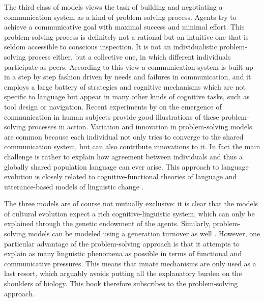 The third class of models views the task of building and negotiating a communication system as a kind of problem-solving process. Agents try to achieve a communicative goal with maximal success and minimal effort. This problem-solving process is definitely not a rational but an intuitive one that is seldom accessible to conscious inspection. It is not an individualistic problem-solving process either, but a collective one, in which different individuals participate as peers. According to this view a communication system is built up in a step by step fashion driven by needs and failures in communication, and it employs a large battery of strategies and cognitive mechanisms which are not specific to language but appear in many other kinds of cognitive tasks, such as tool design or navigation. Recent experiments by \citet{galantucci05experimental} on the emergence of communication in human subjects provide good illustrations of these problem-solving processes in action. Variation and innovation in problem-solving models are common because each individual not only tries to converge to the shared communication system, but can also contribute innovations to it. In fact the main challenge is rather to explain how agreement between individuals and thus a globally shared population language can ever arise. This approach to language evolution is closely related to cognitive-functional theories of language and utterance-based models of linguistic change \citep{croft00explaining, croft05relevance}.

The three models are of course not mutually exclusive: it is clear that the models of cultural evolution expect a rich cognitive-linguistic system, which can only be explained through the genetic endowment of the agents. Similarly, problem-solving models can be modeled using a generation turnover as well \citep{vogt07group}. However, one particular advantage of the problem-solving approach is that it attempts to explain as many linguistic phenomena as possible in terms of functional and communicative pressures. This means that innate mechanisms are only used as a last resort, which arguably avoids putting all the explanatory burden on the shoulders of biology. This book therefore subscribes to the problem-solving approach.

